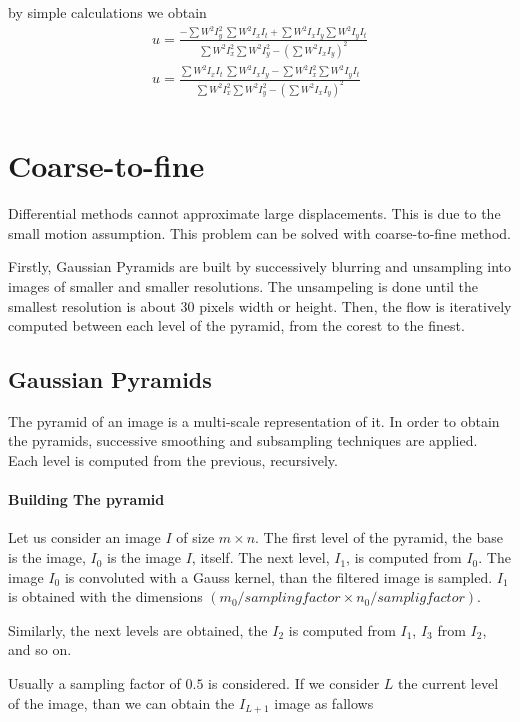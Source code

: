 \documentclass[12pt,a4paper,twoside]{report}
\begin{document}
by simple calculations we obtain
\begin{equation}
\begin{split}
	u =\frac{-\sum W^2I_y^2\ \sum W^2I_xI_t 
		+ \sum W^2I_x I_y  \sum W^2I_yI_t }
	{\sum W^2 I_x^2 \sum W^2 I_y^2
		- (\sum W^2 I_x I_y)^2 } \\
	u =\frac{\sum W^2I_x I_t\ \sum W^2I_xI_y 
		 - \sum W^2I_x^2  \sum W^2I_yI_t }
	{\sum W^2 I_x^2 \sum W^2 I_y^2
		- (\sum W^2 I_x I_y)^2 } \\
\end{split}
\end{equation}
 
 
\section{Coarse-to-fine}
Differential methods cannot approximate large displacements. This is due to the small motion assumption. This problem can be solved with coarse-to-fine method.


 
Firstly, Gaussian Pyramids are built by successively blurring and unsampling into images of smaller and smaller resolutions. The unsampeling is done until the smallest resolution is about 30 pixels width or height.  Then, the flow is iteratively computed between each level of the pyramid, from the corest to the finest.
\subsection{Gaussian Pyramids}
The pyramid of an image is a multi-scale representation of it. In order to obtain the pyramids, successive smoothing and subsampling techniques are applied.  Each level is computed from the previous, recursively.


\paragraph{Building The pyramid} 
 Let us consider an image $I$ of size $m \times n$. The first level of the pyramid, the base is the image, $I_0$ is the image $I$, itself. The next level, $I_1$, is computed from $I_0$. The image $I_0$ is convoluted with a Gauss kernel, than the filtered image is sampled. $I_1$ is obtained with the dimensions $(m_0/sampling factor \times n_0/samplig factor)$. 

Similarly, the next levels are obtained, the $I_2$ is computed from $I_1$, $I_3$ from $I_2$, and so on.

Usually a sampling factor of $0.5$ is considered. If we consider $L$ the current level of the image, than we can obtain the $I_{L+1}$ image as fallows
\end{document}
